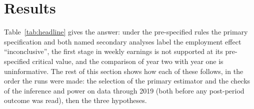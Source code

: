 \section{Results}
\label{sec:results}

Table~\ref{tab:headline} gives the answer: under the pre-specified rules the primary
specification and both named secondary analyses label the employment effect ``inconclusive'',
the first stage in weekly earnings is not supported at its pre-specified critical value, and the
comparison of year two with year one is uninformative. The rest of this section shows how each
of these follows, in the order the runs were made: the selection of the primary estimator and
the checks of the inference and power on data through 2019 (both before any post-period outcome
was read), then the three hypotheses.


